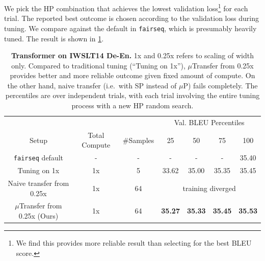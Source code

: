 \documentclass{article}
\theoremstyle{definition}
\begin{document}
We pick the HP combination that achieves the lowest validation loss\footnote{We find this provides more reliable result than selecting for the best BLEU score.} for each trial.
The reported best outcome is chosen according to the validation loss during tuning.
We compare against the default in \texttt{fairseq}, which is presumably heavily tuned.
The result is shown in \cref{tab: iwslt14_transfer}.

\begin{table}[t]
    \centering
    \small
    \caption[$\mu$Transfer results for Transformer on IWSLT14 De-En]{\textbf{Transformer on IWSLT14 De-En.}
    1x and 0.25x refers to scaling of width only. Compared to traditional tuning (``Tuning on 1x''), $\mu$Transfer from 0.25x provides better and more reliable outcome given fixed amount of compute.
    On the other hand, naive transfer (i.e.\ with SP instead of $\mu$P) fails completely.
    The percentiles are over independent trials, with each trial involving the entire tuning process with a new HP random search.
    }
    \begin{tabular}{ccccccc}
        \toprule
        \multicolumn{3}{c}{}                                     & \multicolumn{4}{c}{Val. BLEU Percentiles} \\
        Setup                    & Total Compute & \#Samples & 25 & 50             & 75 & 100            \\ \midrule
        \texttt{fairseq}\citep{ott2019fairseq} default & -             & -             & -   & -              &  -  & 35.40          \\ \midrule
        Tuning on 1x             & 1x            & 5             & 33.62   & 35.00    & 35.35   & 35.45          \\
        Naive transfer from 0.25x          & 1x            & 64            & \multicolumn{4}{c}{training diverged}\\
        $\mu$Transfer from 0.25x (Ours)         & 1x            & 64            & \textbf{35.27}   & \textbf{35.33} & \textbf{35.45}  & \textbf{35.53}
        \\ \bottomrule
        \end{tabular}
    \label{tab: iwslt14_transfer}
\end{table}
\end{document}
